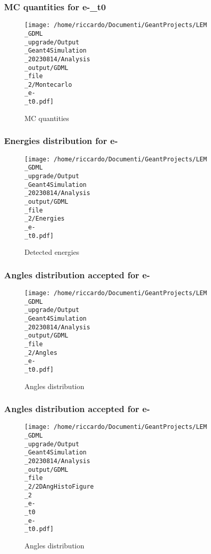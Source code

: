 \documentclass[8pt]{beamer}
\begin{document}
            \begin{frame}
                \frametitle{MC quantities for e-\_t0}
            
        \begin{figure}[h]
            \centering
            \texttt{[image: /home/riccardo/Documenti/GeantProjects/LEM\\\_GDML\\\_upgrade/Output\\\_Geant4Simulation\\\_20230814/Analysis\\\_output/GDML\\\_file\\\_2/Montecarlo\\\_e-\\\_t0.pdf]}
            \caption{MC quantities}
        \end{figure}
        
            \end{frame}
            
            \begin{frame}
                \frametitle{Energies distribution for e-}
            
        \begin{figure}[h]
            \centering
            \texttt{[image: /home/riccardo/Documenti/GeantProjects/LEM\\\_GDML\\\_upgrade/Output\\\_Geant4Simulation\\\_20230814/Analysis\\\_output/GDML\\\_file\\\_2/Energies\\\_e-\\\_t0.pdf]}
            \caption{Detected energies}
        \end{figure}
        
            \end{frame}
            
            \begin{frame}
                \frametitle{Angles distribution accepted for e-}
            
        \begin{figure}[h]
            \centering
            \texttt{[image: /home/riccardo/Documenti/GeantProjects/LEM\\\_GDML\\\_upgrade/Output\\\_Geant4Simulation\\\_20230814/Analysis\\\_output/GDML\\\_file\\\_2/Angles\\\_e-\\\_t0.pdf]}
            \caption{Angles distribution}
        \end{figure}
        
            \end{frame}
            
            \begin{frame}
                \frametitle{Angles distribution accepted for e-}
            
        \begin{figure}[h]
            \centering
            \texttt{[image: /home/riccardo/Documenti/GeantProjects/LEM\\\_GDML\\\_upgrade/Output\\\_Geant4Simulation\\\_20230814/Analysis\\\_output/GDML\\\_file\\\_2/2DAngHistoFigure\\\_2\\\_e-\\\_t0\\\_e-\\\_t0.pdf]}
            \caption{Angles distribution}
        \end{figure}
        
            \end{frame}
            
\end{document}
